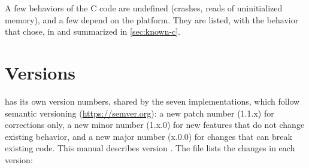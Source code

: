 A few behaviors of the C code are undefined (crashes, reads of uninitialized
memory), and a few depend on the platform. They are listed, with the
behavior that \wfdbx{} chose, in  and
summarized in \cref{sec:known-c}.

\section{Versions}
\label{sec:versions}

\wfdbx{} has its own version numbers, shared by the seven implementations,
which follow semantic versioning (\url{https://semver.org}): a new patch
number (1.1.x) for corrections only, a new minor number (1.x.0) for new
features that do not change existing behavior, and a new major number
(x.0.0) for changes that can break existing code. This manual describes
version \wfdbxversion{}. The file  lists the changes in
each version:
